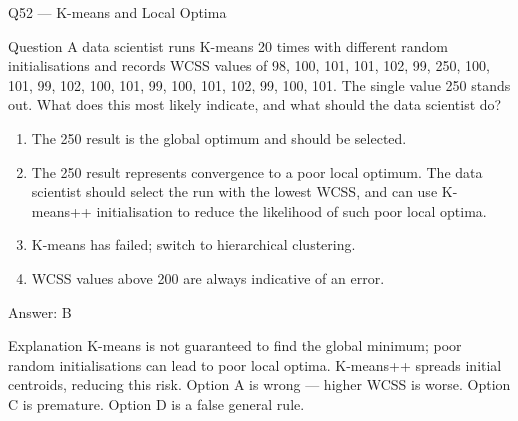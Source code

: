 \documentclass[aspectratio=169,8pt]{beamer}
\begin{document}
	\begin{frame}{Q52 --- K-means and Local Optima}
		\begin{block}{Question}
			A data scientist runs K-means 20 times with different random initialisations and records WCSS values of 98, 100, 101, 101, 102, 99, 250, 100, 101, 99, 102, 100, 101, 99, 100, 101, 102, 99, 100, 101. The single value 250 stands out. What does this most likely indicate, and what should the data scientist do?
		\end{block}
		\begin{enumerate}
			\item The 250 result is the global optimum and should be selected.
			\item The 250 result represents convergence to a poor local optimum. The data scientist should select the run with the lowest WCSS, and can use K-means++ initialisation to reduce the likelihood of such poor local optima.
			\item K-means has failed; switch to hierarchical clustering.
			\item WCSS values above 200 are always indicative of an error.
		\end{enumerate}
		\begin{exampleblock}{Answer: B}\end{exampleblock}
		\begin{block}{Explanation}
			K-means is not guaranteed to find the global minimum; poor random initialisations can lead to poor local optima. K-means++ spreads initial centroids, reducing this risk. Option A is wrong --- higher WCSS is worse. Option C is premature. Option D is a false general rule.
		\end{block}
	\end{frame}
	
\end{document}
